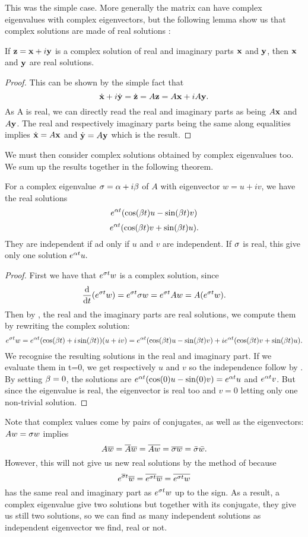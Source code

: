 This was the simple case. More generally the matrix can have complex eigenvalues with complex eigenvectors, but the following lemma show us that complex solutions are made of real solutions :
\begin{lemme} \label{lem:complex}
If $\mathbf{z}=\mathbf{x}+i\mathbf{y}$ is a complex solution of real and imaginary parts $\mathbf{x}$ and $\mathbf{y}$, then $\mathbf{x}$ and $\mathbf{y}$ are real solutions.
\end{lemme}
\begin{proof}
This can be shown by the simple fact that
\[\dot{\mathbf{x}}+i\dot{\mathbf{y}} =\dot{\mathbf{z}} = A\mathbf{z} = A\mathbf{x}+iA\mathbf{y}. \]
As A is real, we can directly read the real and imaginary parts as being $A\mathbf{x}$ and $A\mathbf{y}$. The real and respectively imaginary parts being the same along equalities implies $\dot{\mathbf{x}}=A\mathbf{x}$ and $\dot{\mathbf{y}}=A\mathbf{y}$ which is the result.
\end{proof}
We must then consider complex solutions obtained by complex eigenvalues too. We sum up the results together in the following theorem.
\begin{theoreme} \label{th:eigensolutions}
For a complex eigenvalue $\sigma=\alpha+i\beta$ of $A$ with eigenvector $w=u+iv$, we have the real solutions
\[e^{\alpha t}(\cos(\beta t)u - \sin(\beta t)v)\] 
\[e^{\alpha t}(\cos(\beta t)v + \sin(\beta t)u).\] 
They are independent if ad only if $u$ and $v$ are independent. If $\sigma$ is real, this give only one solution $e^{\alpha t}u.$
\end{theoreme}
\begin{proof}
First we have that $e^{\sigma t}w$ is a complex solution, since 
\[\frac{\mathrm{d}}{\mathrm{d} t}(e^{\sigma t}w) = e^{\sigma t}\sigma w = e^{\sigma t}Aw = A(e^{\sigma t}w).\]
Then by , the real and the imaginary parts are real solutions, we compute them by rewriting the complex solution:
\[e^{\sigma t}w = e^{\alpha t}(\cos(\beta t) + i\sin(\beta t))(u+iv)
= e^{\alpha t}(\cos(\beta t)u - \sin(\beta t)v) + ie^{\alpha t}(\cos(\beta t)v + \sin(\beta t)u).\]
We recognise the resulting solutions in the real and imaginary part. If we evaluate them in t=0, we get respectively $u$ and $v$ so the independence follow by . By setting $\beta=0$, the solutions are $e^{\alpha t}(\cos(0)u - \sin(0)v) = e^{\alpha t}u$ and  $e^{\alpha t}v$. But since the eigenvalue is real, the eigenvector is real too and $v=0$ letting only one non-trivial solution.
\end{proof}
\begin{remarque}
Note that complex values come by pairs of conjugates, as well as the eigenvectors:
$Aw=\sigma w$ implies 
$$A\overline{w} = \overline{A}\overline{w} = \overline{Aw}= \overline{\sigma w} = \bar{\sigma}\bar{w}.$$
However, this will not give us new real solutions by the method of  because $$e^{\overline{\sigma} t}\overline{w}= \overline{e^{\sigma t}}\overline{w} = \overline{e^{\sigma t}w}$$
has the same real and imaginary part as $e^{\sigma t}w$ up to the sign. As a result, a complex eigenvalue give two solutions but together with its conjugate, they give us still two solutions, so we can find as many independent solutions as independent eigenvector we find, real or not.
\end{remarque}
